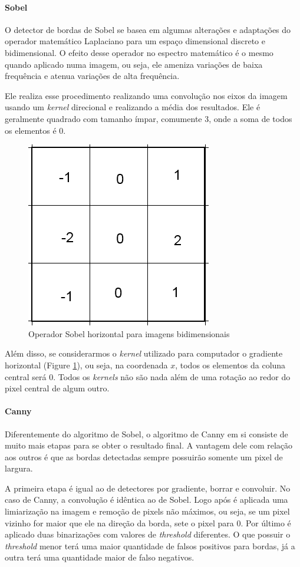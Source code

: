 \documentclass[10pt,twocolumn,letterpaper]{article}
\begin{document}
\paragraph{Sobel}
O detector de bordas de Sobel se basea em algumas alterações e adaptações do operador matemático Laplaciano para um espaço dimensional discreto e bidimensional. O efeito desse operador no espectro matemático é o mesmo quando aplicado numa imagem, ou seja, ele ameniza variações de baixa frequência e atenua variações de alta frequência.\cite{sobel}

Ele realiza esse procedimento realizando uma convolução nos eixos da imagem usando um \emph{kernel} direcional e realizando a média dos resultados. Ele é geralmente quadrado com tamanho ímpar, comumente 3, onde a soma de todos os elementos é 0.

\begin{figure}[!htp]
\centering
\includegraphics[width=0.5\columnwidth]{SobelGx}
\caption{Operador Sobel horizontal para imagens bidimensionais}
\label{fig:SobelGx}
\end{figure}

Além disso, se considerarmos o \emph{kernel} utilizado para computador o gradiente horizontal (Figure \ref{fig:SobelGx}), ou seja, na coordenada $x$, todos os elementos da coluna central será 0. Todos os \emph{kernels} não são nada além de uma rotação ao redor do pixel central de algum outro.

\paragraph{Canny}
Diferentemente do algoritmo de Sobel, o algoritmo de Canny em si consiste de muito mais etapas para se obter o resultado final. A vantagem dele com relação aos outros é que as bordas detectadas sempre possuirão somente um pixel de largura.

A primeira etapa é igual ao de detectores por gradiente, borrar e convoluir. No caso de Canny, a convolução é idêntica ao de Sobel. Logo após é aplicada uma limiarização na imagem e remoção de pixels não máximos, ou seja, se um pixel vizinho for maior que ele na direção da borda, sete o pixel para 0. Por último é aplicado duas binarizações com valores de \emph{threshold} diferentes. O que possuir o \emph{threshold} menor terá uma maior quantidade de falsos positivos para bordas, já a outra terá uma quantidade maior de falso negativos.
\end{document}
